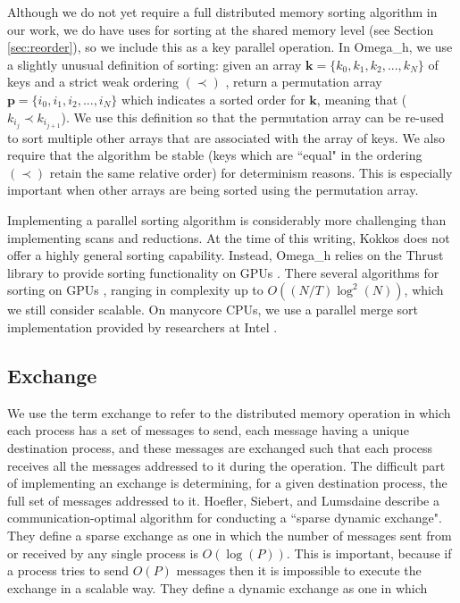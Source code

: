 Although we do not yet require a full distributed memory sorting algorithm
in our work, we do have uses for sorting at the shared memory level
(see Section \ref{sec:reorder}), so we include this as a key parallel operation.
In Omega\_h, we use a slightly unusual definition of sorting:
given an array $\mathbf{k}=\{k_0,k_1,k_2,...,k_N\}$ of keys and
a strict weak ordering $(\prec)$ \cite{roberts2009applied},
return a permutation array
$\mathbf{p}=\{i_0,i_1,i_2,...,i_N\}$ which indicates
a sorted order for $\mathbf{k}$, meaning that ($k_{i_j} \prec k_{i_{j+1}}$).
We use this definition so that the permutation array can be re-used
to sort multiple other arrays that are associated with the array of keys.
We also require that the algorithm be stable (keys which are ``equal"
in the ordering $(\prec)$ retain the same relative order) for
determinism reasons.
This is especially important when other arrays are being sorted
using the permutation array.

Implementing a parallel sorting algorithm is considerably more
challenging than implementing scans and reductions.
At the time of this writing, Kokkos does not offer a highly general
sorting capability.
Instead, Omega\_h relies on the Thrust library to provide sorting functionality
on GPUs \cite{bell2011thrust}.
There several algorithms for sorting on GPUs \cite{satish2009designing},
ranging in complexity up to $O((N/T)\log^2(N))$, which we still consider
scalable.
On manycore CPUs, we use a parallel merge sort implementation provided
by researchers at Intel \cite{robinson2014parallel}.

\subsection{Exchange}

We use the term exchange to refer to the distributed memory operation
in which each process has a set of messages to send, each message
having a unique destination process, and these messages are exchanged
such that each process receives all the messages addressed to it
during the operation.
The difficult part of implementing an exchange is determining, for
a given destination process, the full set of messages addressed to it.
Hoefler, Siebert, and Lumsdaine \cite{hoefler2011scalable} describe
a communication-optimal algorithm for conducting a ``sparse dynamic exchange".
They define a sparse exchange as one in which the number of messages
sent from or received by any single process is $O(\log(P))$.
This is important, because if a process tries to send $O(P)$ messages
then it is impossible to execute the exchange in a scalable way.
They define a dynamic exchange as one in which 

